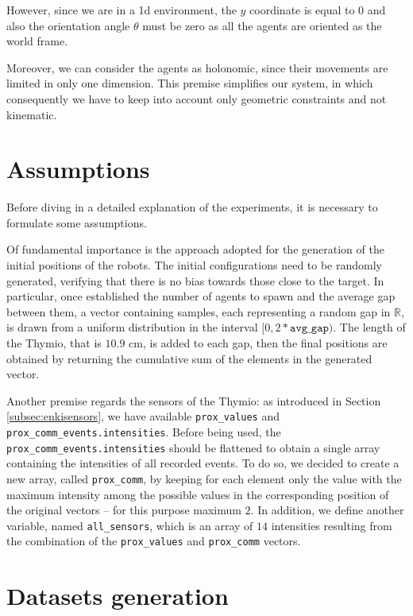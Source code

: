 However, since we are in a \gls{1d} environment, the $y$ coordinate is equal 
to $0$ and also the orientation angle $\theta$ must be zero as all the agents are 
oriented as the world frame. 

Moreover, we can consider the agents as holonomic, since their movements are 
limited in only one dimension. This premise simplifies our system, in which 
consequently we have to keep into account only geometric constraints and not
kinematic.

\section{Assumptions}
\label{sec:assum}
Before diving in a detailed explanation of the experiments, it is necessary to 
formulate some assumptions.

Of fundamental importance is the approach adopted for the generation of the 
initial positions of the robots.
The initial configurations need to be randomly generated, verifying that there is 
no bias towards those close to the target.
In particular, once established the number of agents to spawn and the average 
gap between them, a vector containing samples, each representing a random 
gap in $\mathbb{R}$, is drawn from a uniform distribution in the interval $[0, 
2*\mathtt{avg\_gap})$. 
The length of the Thymio, that is $10.9$ \gls{cm}, is added to each gap, then the 
final positions are obtained by returning the cumulative sum of the elements in 
the generated vector. 

Another premise regards the sensors of the Thymio: as introduced in Section 
\ref{subsec:enkisensors}, we have available \texttt{prox\_values} and 
\texttt{prox\_comm\_events.intensities}. Before being used, the 
\texttt{prox\_comm\_events.intensities} should be flattened to obtain a single 
array containing the intensities of all recorded events. 
To do so, we decided to create a new array, called \texttt{prox\_comm}, by 
keeping for each element only the value with the maximum intensity among the 
possible values in the corresponding position of the original vectors – for this 
purpose maximum $2$.
In addition, we define another variable, named \texttt{all\_sensors}, which is an 
array of $14$ intensities resulting from the combination of the 
\texttt{prox\_values} and \texttt{prox\_comm} vectors.

\section{Datasets generation}
\label{sec:dataset}

